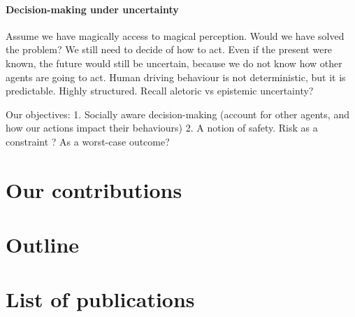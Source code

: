 \paragraph{Decision-making under uncertainty}

Assume we have magically access to magical perception. Would we have solved the problem?
We still need to decide of how to act. Even if the present were known, the future would still be uncertain, because we do not know how other agents are going to act.
Human driving behaviour is not deterministic, but it is predictable. Highly structured.
Recall aletoric vs epistemic uncertainty?

Our objectives: 
1. Socially aware decision-making (account for other agents, and how our actions impact their behaviours)
2. A notion of safety. Risk as a constraint ? As a worst-case outcome?

\section{Our contributions}
\section{Outline}


\section{List of publications}